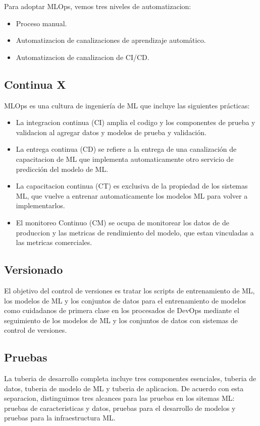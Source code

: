\documentclass[twoside,twocolumn]{article}
\begin{document}
Para adoptar MLOps, vemos tres niveles de automatizacion:
\begin{itemize}
    \item  Proceso manual.
    \item  Automatizacion de canalizaciones de aprendizaje automático.
    \item  Automatizacion de canalizacion de CI/CD.
\end{itemize}

\subsection{Continua X}
MLOps es una cultura de ingeniería de ML que incluye las siguientes prácticas:  
\begin{itemize}
    \item  La integracion continua (CI) amplia el codigo y los componentes de prueba y validacion al agregar datos y modelos de prueba y validación.
    \item  La entrega continua (CD) se refiere a la entrega de una canalización de capacitacion de ML que implementa automaticamente otro servicio de predicción del modelo de ML.
    \item  La capacitacion continua (CT) es exclusiva de la propiedad de los sistemas ML, que vuelve a entrenar automaticamente los modelos ML para volver a implementarlos.
    \item  El monitoreo Continuo (CM) se ocupa de monitorear los datos de de produccion y las metricas de rendimiento del modelo, que estan vinculadas a las metricas comerciales.   
\end{itemize}
   

\subsection{Versionado}
El objetivo del control de versiones es tratar los scripts de entrenamiento de ML, los modelos de ML y los conjuntos de datos para el entrenamiento de modelos como cuidadanos de primera clase en los procesados
de DevOps mediante el seguimiento de los modelos de ML y los conjuntos de datos con sistemas de control de versiones.


\subsection{Pruebas}
La tuberia de desarrollo completa incluye tres componentes esenciales, tuberia de datos, tuberia de modelo de ML y tuberia de aplicacion.
De acuerdo con esta separacion, distinguimos tres alcances para las pruebas en los sitemas ML: pruebas de caracteristicas y datos, pruebas para el desarrollo de modelos y pruebas para la infraestructura ML.
\end{document}
